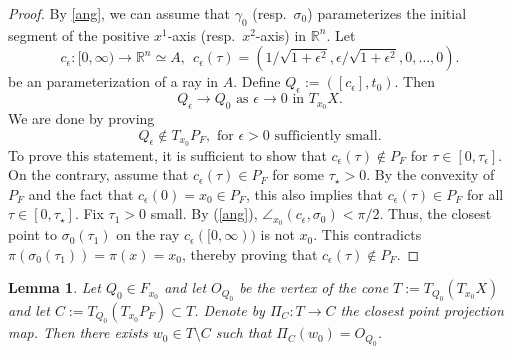 \documentclass[12pt]{amsart}
\newtheorem{lemma}[theorem]{Lemma}
\theoremstyle{definition}
\numberwithin{equation}{section}
\begin{document}
\begin{proof}
By \eqref{ang}, we can assume that $\gamma_0$ (resp.~$\sigma_0$) parameterizes the initial segment of the positive $x^1$-axis (resp.~$x^2$-axis) in $\mathbb R^n$.
Let 
\[
c_\epsilon:[0,\infty) \to \mathbb R^n \simeq A, \ \ c_\epsilon(\tau) = (1/\sqrt{1+\epsilon^2}, \epsilon/\sqrt{1+\epsilon^2}, 0, \dots, 0).
\]
be an parameterization of a  ray in $A$. 
Define
$Q_\epsilon:=([c_\epsilon], t_0).$ Then
\[
Q_\epsilon \to Q_0 \mbox{ as $\epsilon \to 0$  in }T_{x_0}X.
\]
We are done by proving
\[
Q_\epsilon \notin T_{x_0}P_F, \mbox{ for $\epsilon>0$ sufficiently small.}
\]
To prove this statement, it is sufficient to show that $c_{\epsilon}( \tau) \notin P_F$ for $\tau\in [0,\tau_\epsilon]$.  On the contrary, assume that $c_{\epsilon}( \tau) \in P_F$ for some $\tau_\star >0$.  By the convexity of $P_F$ and the fact that $c_\epsilon(0)=x_0 \in P_F$, this also implies that $c_{\epsilon}( \tau) \in P_F$ for all $\tau \in [0, \tau_\star]$. Fix $\tau_1>0$ small. By (\ref{ang}), $\angle_{x_0}(c_\epsilon,\sigma_0)<\pi/2$.  Thus,   the closest point to $\sigma_0(\tau_1)$ on the ray $c_\epsilon([0,\infty))$ is not $x_0$. This contradicts $\pi(\sigma_0(\tau_1))=\pi(x)=x_0$, thereby proving that $c_\epsilon( \tau) \notin P_F$.   
\end{proof}




\begin{lemma} \label{PiC}
Let $Q_0 \in F_{x_0}$ and let $O_{Q_0}$ be the vertex of the cone $T:=T_{Q_0}(T_{x_0}X)$ and let  $C:=T_{Q_0}(T_{x_0}P_F) \subset T$.  Denote by $\Pi_C:T \to C$ the closest point projection map.  Then there exists $w_0 \in T \setminus C$ such that $\Pi_C(w_0)=O_{Q_0}$. 
\end{lemma}
\end{document}
